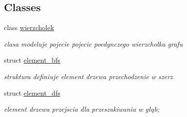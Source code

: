 \subsection*{\-Classes}
\begin{DoxyCompactItemize}
\item 
class \hyperlink{classwierzcholek}{wierzcholek}
\begin{DoxyCompactList}\small\item\em clasa modeluje pojecie pojecie poedynczego wierzcholka grafu \end{DoxyCompactList}\item 
struct \hyperlink{structelement__bfs}{element\-\_\-bfs}
\begin{DoxyCompactList}\small\item\em struktura definiuje element drzewa przechodzenie w szerz \end{DoxyCompactList}\item 
struct \hyperlink{structelement__dfs}{element\-\_\-dfs}
\begin{DoxyCompactList}\small\item\em element drzewa przejscia dla przeszukiwania w głąb; \end{DoxyCompactList}\end{DoxyCompactItemize}
